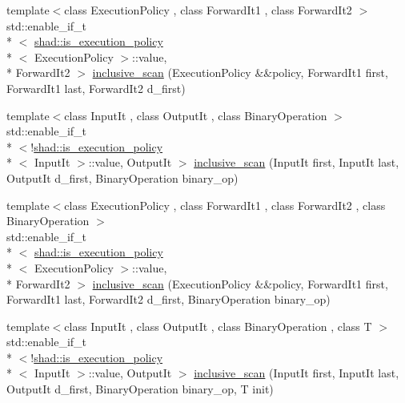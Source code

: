 \begin{DoxyCompactItemize}
\item 
{\footnotesize template$<$class Execution\-Policy , class Forward\-It1 , class Forward\-It2 $>$ }\\std\-::enable\-\_\-if\-\_\-t\\*
$<$ \hyperlink{structshad_1_1is__execution__policy}{shad\-::is\-\_\-execution\-\_\-policy}\\*
$<$ Execution\-Policy $>$\-::value, \\*
Forward\-It2 $>$ \hyperlink{namespaceshad_a1d3a1d24cc9d681bd236220c3db36a4b}{inclusive\-\_\-scan} (Execution\-Policy \&\&policy, Forward\-It1 first, Forward\-It1 last, Forward\-It2 d\-\_\-first)
\item 
{\footnotesize template$<$class Input\-It , class Output\-It , class Binary\-Operation $>$ }\\std\-::enable\-\_\-if\-\_\-t\\*
$<$!\hyperlink{structshad_1_1is__execution__policy}{shad\-::is\-\_\-execution\-\_\-policy}\\*
$<$ Input\-It $>$\-::value, Output\-It $>$ \hyperlink{namespaceshad_ab2f0bce9d14c5ec29670dbbcae4a7e58}{inclusive\-\_\-scan} (Input\-It first, Input\-It last, Output\-It d\-\_\-first, Binary\-Operation binary\-\_\-op)
\item 
{\footnotesize template$<$class Execution\-Policy , class Forward\-It1 , class Forward\-It2 , class Binary\-Operation $>$ }\\std\-::enable\-\_\-if\-\_\-t\\*
$<$ \hyperlink{structshad_1_1is__execution__policy}{shad\-::is\-\_\-execution\-\_\-policy}\\*
$<$ Execution\-Policy $>$\-::value, \\*
Forward\-It2 $>$ \hyperlink{namespaceshad_adc86ffac5f28d6798c40434c5017d86f}{inclusive\-\_\-scan} (Execution\-Policy \&\&policy, Forward\-It1 first, Forward\-It1 last, Forward\-It2 d\-\_\-first, Binary\-Operation binary\-\_\-op)
\item 
{\footnotesize template$<$class Input\-It , class Output\-It , class Binary\-Operation , class T $>$ }\\std\-::enable\-\_\-if\-\_\-t\\*
$<$!\hyperlink{structshad_1_1is__execution__policy}{shad\-::is\-\_\-execution\-\_\-policy}\\*
$<$ Input\-It $>$\-::value, Output\-It $>$ \hyperlink{namespaceshad_a3a46378a583f1c96000caa42e640ab5c}{inclusive\-\_\-scan} (Input\-It first, Input\-It last, Output\-It d\-\_\-first, Binary\-Operation binary\-\_\-op, T init)

\end{DoxyCompactItemize}

